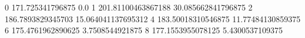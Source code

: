 0 171.725341796875 0.0
1 201.81100463867188 30.085662841796875
2 186.7893829345703 15.064041137695312
4 183.50018310546875 11.77484130859375
6 175.4761962890625 3.7508544921875
8 177.1553955078125 5.4300537109375

